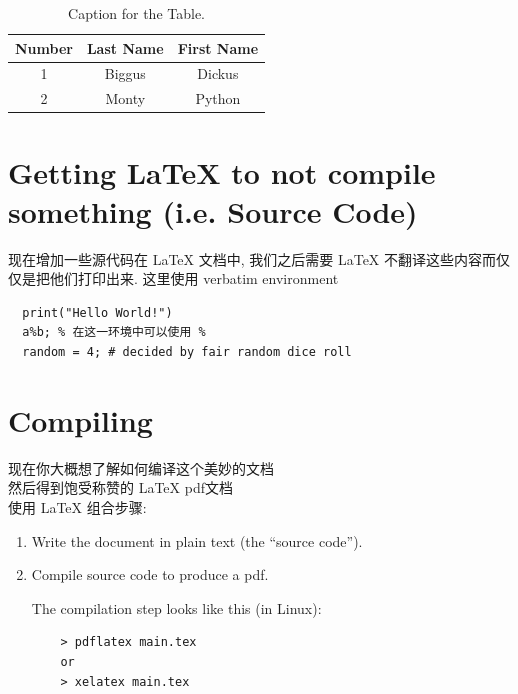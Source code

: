 \documentclass[fontset=adobe, 12pt]{article}
\begin{document}
\begin{table}[H]
  \caption{Caption for the Table.}
  \centering
  \begin{tabular}{c|cc}
    Number & Last Name & First Name \\ %
    \hline
    1 & Biggus & Dickus \\
    2 & Monty & Python
  \end{tabular}
\end{table}

\section{Getting \LaTeX \hspace{1pt} to not compile something (i.e. Source Code)}

现在增加一些源代码在 \LaTeX \hspace{1pt} 文档中,
我们之后需要 \LaTeX \hspace{1pt} 不翻译这些内容而仅仅是把他们打印出来.
这里使用 verbatim environment

\begin{verbatim}
  print("Hello World!")
  a%b; % 在这一环境中可以使用 %
  random = 4; # decided by fair random dice roll
\end{verbatim}


\section{Compiling}

现在你大概想了解如何编译这个美妙的文档\\
然后得到饱受称赞的 \LaTeX \hspace{1pt} pdf文档\\
使用 \LaTeX \hspace{1pt} 组合步骤:
\begin{enumerate}
  \item Write the document in plain text (the ``source code'').
  \item Compile source code to produce a pdf.

  The compilation step looks like this (in Linux):

  \begin{verbatim}
    > pdflatex main.tex
    or
    > xelatex main.tex
  \end{verbatim}
\end{enumerate}
\end{document}
